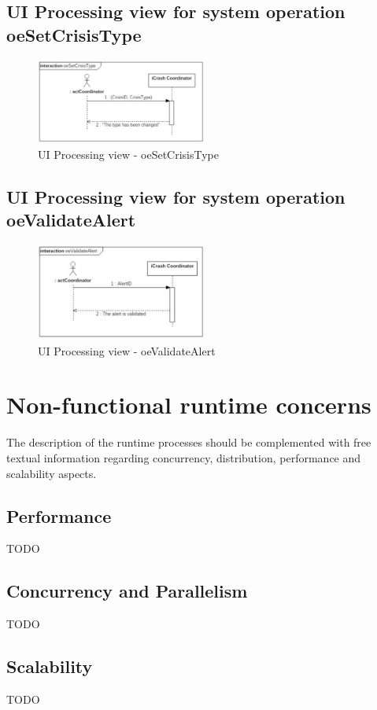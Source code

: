 \subsection{UI Processing view for system operation oeSetCrisisType}

\begin{figure}[h]
	\centering	
	\captionsetup{justification=centering}
	\includegraphics[width=0.5\textwidth]{./images/ui_oeSetCrisisType.eps}
	\caption{UI Processing view - oeSetCrisisType}
\end{figure}


\subsection{UI Processing view for system operation oeValidateAlert}

\begin{figure}[h]
	\centering	
	\captionsetup{justification=centering}
	\includegraphics[width=0.5\textwidth]{./images/ui_oeValidateAlert.eps}
	\caption{UI Processing view - oeValidateAlert}
\end{figure}



\section{Non-functional runtime concerns}
The description of the runtime processes should be complemented with free
textual information regarding concurrency, distribution, performance and scalability aspects.


\subsection{Performance}
TODO



\subsection{Concurrency and Parallelism}
TODO




\subsection{Scalability}
TODO






